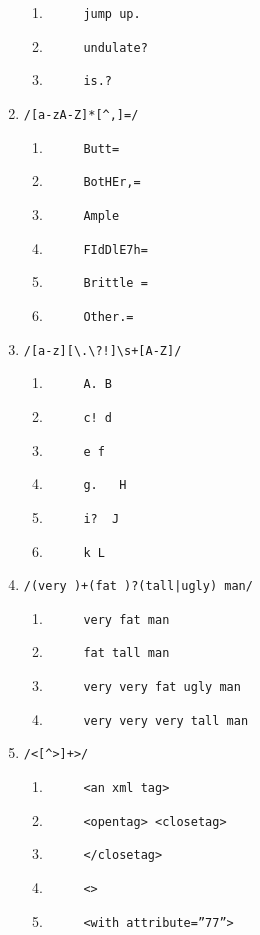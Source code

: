\documentclass{article}
\begin{document}
\begin{multicols}{2}
\begin{enumerate}
\begin{enumerate}
\item \verb|     jump up.|
\item \verb|     undulate?|
\item \verb|     is.?|
 \end{enumerate}
 \columnbreak
\item  \verb|/[a-zA-Z]*[^,]=/|
 \begin{enumerate}
\item \verb|     Butt=|
\item \verb|     BotHEr,=|
\item \verb|     Ample|
\item \verb|     FIdDlE7h=|
\item \verb|     Brittle =|
\item \verb|     Other.=|
\end{enumerate} 
\item  \verb|/[a-z][\.\?!]\s+[A-Z]/|
\begin{enumerate}
\item \verb|     A. B|
\item \verb|     c! d|
\item \verb|     e f|
\item \verb|     g.   H|
\item \verb|     i?  J|
\item \verb|     k L|
\end{enumerate} 
\item  \verb./(very )+(fat )?(tall|ugly) man/.
 \begin{enumerate}
\item \verb|     very fat man|
\item \verb|     fat tall man|
\item \verb|     very very fat ugly man|
\item \verb|     very very very tall man|
\end{enumerate} 
\item  \verb|/<[^>]+>/|
\begin{enumerate} 
\item \verb|     <an xml tag>|
\item \verb|     <opentag> <closetag>|
\item \verb|     </closetag>|
\item \verb|     <>|
\item \verb|     <with attribute=”77”>|
\end{enumerate}
\end{enumerate}
\end{multicols}
\end{document}
